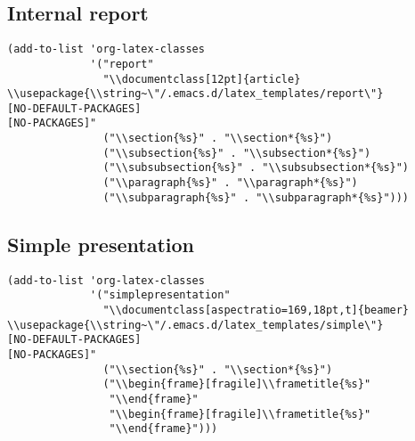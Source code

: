 \documentclass[12pt]{article}
\begin{document}
\subsection{Internal report}
\label{sec:orga316e65}
\begin{verbatim}
(add-to-list 'org-latex-classes
             '("report"
               "\\documentclass[12pt]{article}
\\usepackage{\\string~\"/.emacs.d/latex_templates/report\"}
[NO-DEFAULT-PACKAGES]
[NO-PACKAGES]"
               ("\\section{%s}" . "\\section*{%s}")
               ("\\subsection{%s}" . "\\subsection*{%s}")
               ("\\subsubsection{%s}" . "\\subsubsection*{%s}")
               ("\\paragraph{%s}" . "\\paragraph*{%s}")
               ("\\subparagraph{%s}" . "\\subparagraph*{%s}")))
\end{verbatim}

\subsection{Simple presentation}
\label{sec:org1a12949}

\begin{verbatim}
(add-to-list 'org-latex-classes
             '("simplepresentation"
               "\\documentclass[aspectratio=169,18pt,t]{beamer}
\\usepackage{\\string~\"/.emacs.d/latex_templates/simple\"}
[NO-DEFAULT-PACKAGES]
[NO-PACKAGES]"
               ("\\section{%s}" . "\\section*{%s}")
               ("\\begin{frame}[fragile]\\frametitle{%s}"
                "\\end{frame}"
                "\\begin{frame}[fragile]\\frametitle{%s}"
                "\\end{frame}")))
\end{verbatim}
\end{document}
